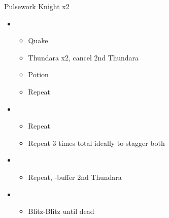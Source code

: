 	\begin{battle}[0:37]{Pulsework Knight x2}
		\begin{itemize}
			\item \first
			      \begin{itemize}
				      \item Quake
				      \item Thundara x2, cancel 2nd Thundara
				      \item Potion
				      \item Repeat
			      \end{itemize}
			\item \second
			      \begin{itemize}
				      \item Repeat
				      \item Repeat 3 times total ideally to stagger both
			      \end{itemize}
			\item \third
			      \begin{itemize}
				      \item Repeat, \com-buffer 2nd Thundara
			      \end{itemize}
			\item \fifth
			      \begin{itemize}
				      \item Blitz-Blitz until dead
			      \end{itemize}
		\end{itemize}
	\end{battle}

	
